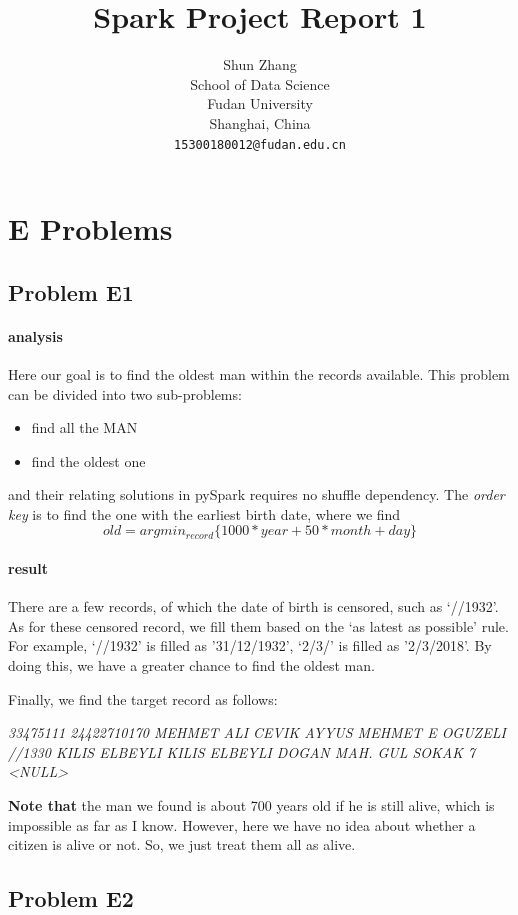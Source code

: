 \documentclass{article}
\title{Spark Project Report 1}
\author{
  Shun Zhang \\
  School of Data Science\\
  Fudan University\\
  Shanghai, China \\
  \texttt{15300180012@fudan.edu.cn} \\
}
\begin{document}

\maketitle

\section{E Problems}

\subsection{Problem E1}
\paragraph{analysis}
Here our goal is to find the oldest man within the records available. This problem can be divided into two sub-problems:
\begin{itemize}
\item find all the MAN
\item find the oldest one
\end{itemize}
and their relating solutions in pySpark requires no shuffle dependency. The \emph{order key} is to find the one with the earliest birth date, where we find \[old = argmin_{record}\{ 1000*year + 50*month + day \}\]

\paragraph{result}
There are a few records, of which the date of birth is censored, such as `//1932'. As for these censored record, we fill them based on the `as latest as possible' rule. For example, `//1932' is filled as '31/12/1932', `2/3/' is filled as '2/3/2018'. By doing this, we have a greater chance to find the oldest man.

Finally, we find the target record as follows:

\emph{33475111 24422710170 MEHMET ALI CEVIK AYYUS MEHMET E OGUZELI //1330 KILIS ELBEYLI KILIS ELBEYLI DOGAN MAH. GUL SOKAK 7 <NULL>}

\textbf{Note that} the man we found is about 700 years old if he is still alive, which is impossible as far as I know. However, here we have no idea about whether a citizen is alive or not. So, we just treat them all as alive.


\subsection{Problem E2}
\end{document}
